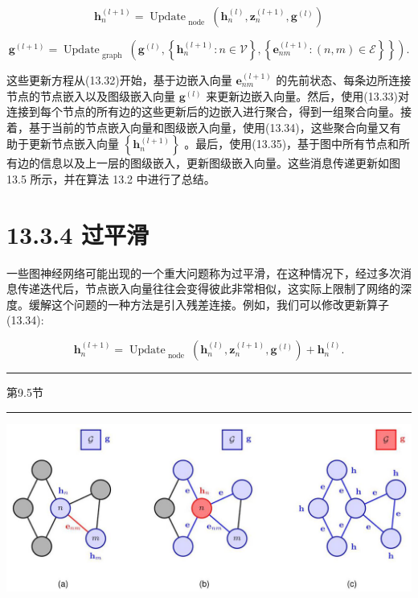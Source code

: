 \documentclass[10pt]{article}
\newcommand{\HRule}{\begin{center}\rule{0.9\linewidth}{0.2mm}\end{center}}
\begin{document}
\[
{\mathbf{h}}_{n}^{\left( l + 1\right) } = {\operatorname{Update}}_{\text{ node }}\left( {{\mathbf{h}}_{n}^{\left( l\right) },{\mathbf{z}}_{n}^{\left( l + 1\right) },{\mathbf{g}}^{\left( l\right) }}\right)  \tag{13.34}
\]

\[
\left. {{\mathbf{g}}^{\left( l + 1\right) } = {\operatorname{Update}}_{\text{ graph }}\left( {{\mathbf{g}}^{\left( l\right) },\left\{  {{\mathbf{h}}_{n}^{\left( l + 1\right) } : n \in  \mathcal{V}}\right\}  ,\left\{  {{\mathbf{e}}_{nm}^{\left( l + 1\right) } : \left( {n,m}\right)  \in  \mathcal{E}}\right\}  }\right\}  }\right) . \tag{13.35}
\]

这些更新方程从(13.32)开始，基于边嵌入向量 \({\mathbf{e}}_{nm}^{\left( l + 1\right) }\) 的先前状态、每条边所连接节点的节点嵌入以及图级嵌入向量 \({\mathbf{g}}^{\left( l\right) }\) 来更新边嵌入向量。然后，使用(13.33)对连接到每个节点的所有边的这些更新后的边嵌入进行聚合，得到一组聚合向量。接着，基于当前的节点嵌入向量和图级嵌入向量，使用(13.34)，这些聚合向量又有助于更新节点嵌入向量 \(\left\{  {\mathbf{h}}_{n}^{\left( l + 1\right) }\right\}\) 。最后，使用(13.35)，基于图中所有节点和所有边的信息以及上一层的图级嵌入，更新图级嵌入向量。这些消息传递更新如图 13.5 所示，并在算法 13.2 中进行了总结。

\section*{13.3.4 过平滑}

一些图神经网络可能出现的一个重大问题称为过平滑，在这种情况下，经过多次消息传递迭代后，节点嵌入向量往往会变得彼此非常相似，这实际上限制了网络的深度。缓解这个问题的一种方法是引入残差连接。例如，我们可以修改更新算子(13.34):

\[
{\mathbf{h}}_{n}^{\left( l + 1\right) } = {\operatorname{Update}}_{\text{ node }}\left( {{\mathbf{h}}_{n}^{\left( l\right) },{\mathbf{z}}_{n}^{\left( l + 1\right) },{\mathbf{g}}^{\left( l\right) }}\right)  + {\mathbf{h}}_{n}^{\left( l\right) }. \tag{13.36}
\]

\HRule

第9.5节

\HRule

\begin{center}
\includegraphics[max width=1.0\textwidth]{images/0194e279-9b28-703a-88f4-c3ac21e2010d_442_234_340_1307_542_0.jpg}
\end{center}
\hspace*{3em} 
\end{document}
